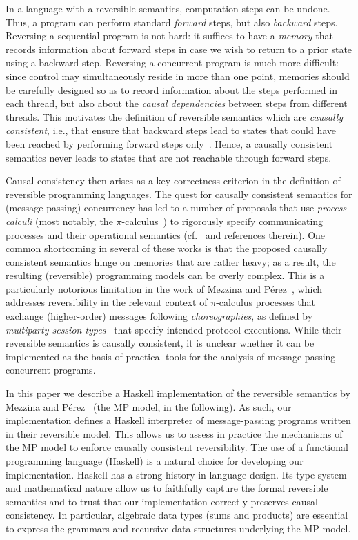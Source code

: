 \documentclass[runningheads,plain]{llncs}
\begin{document}
In a language with a reversible semantics, computation steps can be undone.
Thus, a program can perform standard \emph{forward} steps, but also \emph{backward} steps.
Reversing a sequential program is not hard: it suffices to have a \emph{memory} that records information about forward steps in case we wish to return to a prior state using a backward step. Reversing a concurrent program is much more difficult: since control may simultaneously reside in more than one point, memories should be carefully designed so as to record information about the steps performed in each thread, but also about the \emph{causal dependencies} between steps from different threads.
This motivates the definition of reversible semantics which are \emph{causally consistent}, i.e., that ensure that backward steps lead to states that could  have been reached by performing forward steps only~\cite{DBLP:journals/eatcs/Lanese14}. Hence, a causally consistent  semantics never leads to states that are not reachable through forward steps. 

Causal consistency then arises as a key correctness criterion in the definition of reversible programming languages. The quest for causally consistent semantics for (message-passing) concurrency has led to a number of proposals that use  \emph{process calculi} (most notably, the $\pi$-calculus~\cite{MilnerR:calmp1}) to rigorously specify communicating processes and their operational semantics (cf.~\cite{DBLP:conf/ppdp/MezzinaP17} and references therein). One common shortcoming in several of these works is that the proposed causally consistent semantics hinge on memories that are rather heavy; as a result, the resulting (reversible) programming models can be  overly complex. This is a particularly notorious limitation in the work of Mezzina and P\'{e}rez~\cite{DBLP:conf/ppdp/MezzinaP17}, which addresses reversibility in the relevant context of $\pi$-calculus processes that exchange (higher-order) messages following \emph{choreographies}, as defined by \emph{multiparty session types}~\cite{DBLP:conf/popl/HondaYC08} that specify intended protocol executions. While their reversible semantics   is causally consistent, it is unclear whether it can be implemented as the basis of practical tools for the  analysis of message-passing concurrent programs.

In this paper we describe a Haskell implementation of the reversible semantics  by Mezzina and P\'{e}rez~\cite{DBLP:conf/ppdp/MezzinaP17} (the MP model, in the following). As such, our implementation defines a Haskell interpreter of message-passing programs written in their reversible model. This allows us to assess in practice the mechanisms %
of the MP model
to enforce causally consistent reversibility. The use of a functional programming language (Haskell) is a natural choice for developing our implementation. Haskell has a strong history in language design. Its type system and mathematical nature allow us to faithfully capture the formal reversible semantics and to trust that our implementation  correctly preserves causal consistency. In particular, algebraic data types (sums and products) are essential to express the grammars and recursive data structures underlying the MP model.
\end{document}
